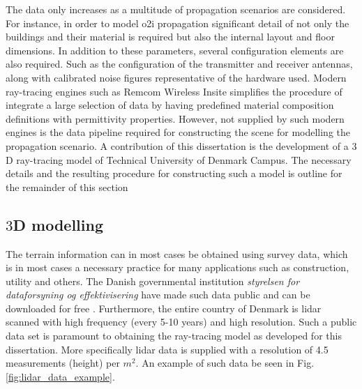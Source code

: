 The data only increases as a multitude of propagation scenarios are considered. For instance, in order to model \gls{o2i} propagation significant detail of not only the buildings and their material is required but also the internal layout and floor dimensions. In addition to these parameters, several configuration elements are also required. Such as the configuration of the transmitter and receiver antennas, along with calibrated noise figures representative of the hardware used. Modern ray-tracing engines such as Remcom Wireless Insite \cite{remcom} simplifies the procedure of integrate a large selection of data by having predefined material composition definitions with permittivity properties. However, not supplied by such modern engines is the data pipeline required for constructing the scene for modelling the propagation scenario. A contribution of this dissertation is the development of a $3$D ray-tracing model of Technical University of Denmark Campus. The necessary details and the resulting procedure for constructing such a model is outline for the remainder of this section

\subsection{$3$D modelling}

The terrain information can in most cases be obtained using survey data, which is in most cases a necessary practice for many applications such as construction, utility and others. The Danish governmental institution \emph{styrelsen for dataforsyning og effektivisering} have made such data public and can be downloaded for free \cite{kortforsyningen}. Furthermore, the entire country of Denmark is \gls{lidar} scanned with high frequency (every 5-10 years) and high resolution. Such a public data set is paramount to obtaining the ray-tracing model as developed for this dissertation. More specifically \gls{lidar} data is supplied with a resolution of 4.5 measurements (height) per $m^2$. An example of such data be seen in Fig. \ref{fig:lidar_data_example}. 

